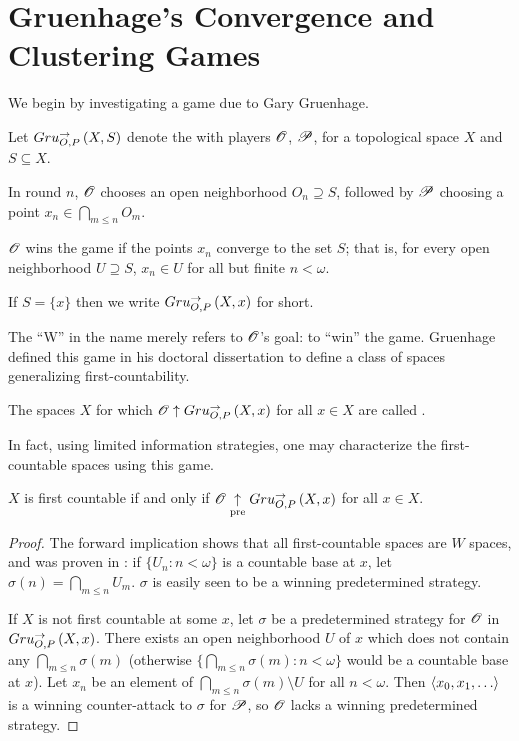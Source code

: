 
\chapter{Gruenhage's Convergence and Clustering Games}

We begin by investigating a game due to Gary Gruenhage.

\begin{game}
  Let $Gru_{O,P}^{\to}\left({X},{S}\right)$ denote the  with
  players $\mathscr{O}$, $\mathscr{P}$, for a topological space $X$ and $S\subseteq X$.

  In round $n$, $\mathscr{O}$ chooses an open neighborhood $O_n\supseteq S$, followed
  by $\mathscr{P}$ choosing a point $x_n\in \bigcap_{m\leq n}O_m$.

  $\mathscr{O}$ wins the game if the points $x_n$ converge to the set $S$; that is,
  for every open neighborhood $U\supseteq S$, $x_n\in U$ for
  all but finite $n<\omega$.

  If $S=\{x\}$ then we write $Gru_{O,P}^{\to}\left({X},{x}\right)$ for short.
\end{game}

The ``W'' in the name merely refers to $\mathscr{O}$'s goal: to ``win'' the game.
Gruenhage defined this game in his doctoral dissertation to define a class
of spaces generalizing first-countability. \cite{MR0413049}

\begin{defn}
  The spaces $X$ for which $\mathscr{O} \uparrow Gru_{O,P}^{\to}\left({X},{x}\right)$ for all $x\in X$ are
  called .
\end{defn}

In fact, using limited information strategies, one may characterize the
first-countable spaces using this game.

\begin{prop}
  $X$ is first countable
    if and only if
  $\mathscr{O} \underset{\text{pre}}{\uparrow} Gru_{O,P}^{\to}\left({X},{x}\right)$ for all $x\in X$.
\end{prop}

\begin{proof}
  The forward implication shows that all first-countable spaces are $W$ spaces,
  and was proven in \cite{MR0413049}: if $\{U_n:n<\omega\}$ is a countable
  base at $x$, let $\sigma(n)=\bigcap_{m\leq n} U_m$. $\sigma$ is easily seen
  to be a winning predetermined strategy.

  If $X$ is not first countable at some $x$, let $\sigma$ be a
  predetermined strategy for $\mathscr{O}$ in $Gru_{O,P}^{\to}\left({X},{x}\right)$. There exists
  an open neighborhood $U$ of $x$ which does not contain any
  $\bigcap_{m\leq n}\sigma(m)$ (otherwise
  $\{\bigcap_{m\leq n}\sigma(m):n<\omega\}$ would be a countable base at $x$).
  Let $x_n$ be an element of $\bigcap_{m\leq n}\sigma(m)\setminus U$ for all
  $n<\omega$. Then $\<x_0,x_1,\dots\>$ is a winning counter-attack to $\sigma$
  for $\mathscr{P}$, so $\mathscr{O}$ lacks a winning predetermined strategy.
\end{proof}

